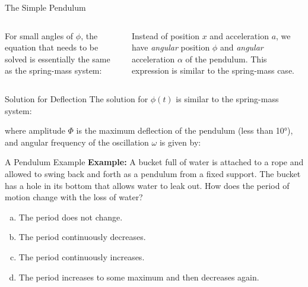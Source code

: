 \documentclass[12pt,compress,aspectratio=169]{beamer}
\begin{document}
\begin{frame}{The Simple Pendulum}
  \begin{columns}
    For small angles of $\phi$, the equation that needs to be solved is
    essentially the same as the spring-mass system:


    \vspace{-.1in}Instead of position $x$ and acceleration $a$, we have
    \emph{angular} position $\phi$ and \emph{angular} acceleration $\alpha$ of
    the pendulum. This expression is similar to the spring-mass case.
    
  \end{columns}
\end{frame}



\begin{frame}{Solution for Deflection}
  The solution for $\phi(t)$ is similar to the spring-mass system:

    
  where amplitude $\Phi$ is the maximum deflection of the pendulum (less than
  \ang{10}), and angular frequency of the oscillation $\omega$ is given by:
  
\end{frame}



\begin{frame}{A Pendulum Example}
  \textbf{Example:} A bucket full of water is attached to a rope and allowed
  to swing back and forth as a pendulum from a fixed support. The bucket has a
  hole in its bottom that allows water to leak out. How does the period of
  motion change with the loss of water?
  \begin{enumerate}[(a)]
  \item The period does not change.
  \item The period continuously decreases.
  \item The period continuously increases.
  \item The period increases to some maximum and then decreases again.
  \end{enumerate}
\end{frame}
\end{document}
